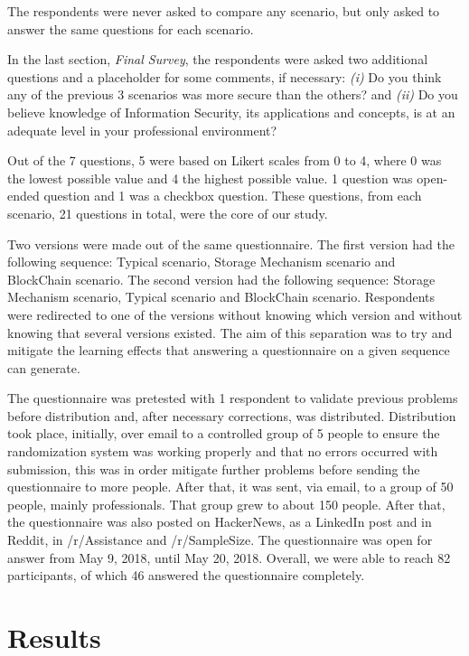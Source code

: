 The respondents were never asked to compare any scenario, but only asked to answer the same questions for each scenario.

In the last section, \textit{Final Survey}, the respondents were asked two additional questions and a placeholder for some comments, if necessary: \emph{(i)} Do you think any of the previous 3 scenarios was more secure than the others? and \emph{(ii)} Do you believe knowledge of Information Security, its applications and concepts, is at an adequate level in your professional environment?


Out of the 7 questions, 5 were based on Likert scales from 0 to 4, where 0 was the lowest possible value and 4 the highest possible value. 1 question was open-ended question and 1 was a checkbox question. These questions, from each scenario, 21 questions in total, were the core of our study.

Two versions were made out of the same questionnaire. The first version had the following sequence: Typical scenario, Storage Mechanism scenario and BlockChain scenario. The second version had the following sequence: Storage Mechanism scenario, Typical scenario and BlockChain scenario. Respondents were redirected to one of the versions without knowing which version and without knowing that several versions existed. The aim of this separation was to try and mitigate the learning effects that answering a questionnaire on a given sequence can generate.

The questionnaire was pretested with 1 respondent to validate previous problems before distribution and, after necessary corrections, was distributed. Distribution took place, initially, over email to a controlled group of 5 people to ensure the randomization system was working properly and that no errors occurred with submission, this was in order mitigate further problems before sending the questionnaire to more people. After that, it was sent, via email, to a group of 50 people, mainly professionals. That group grew to about 150 people. After that, the questionnaire was also posted on HackerNews, as a LinkedIn post and in Reddit, in /r/Assistance and /r/SampleSize. The questionnaire was open for answer from May 9, 2018, until May 20, 2018. Overall, we were able to reach 82 participants, of which 46 answered the questionnaire completely.

\section{Results}

